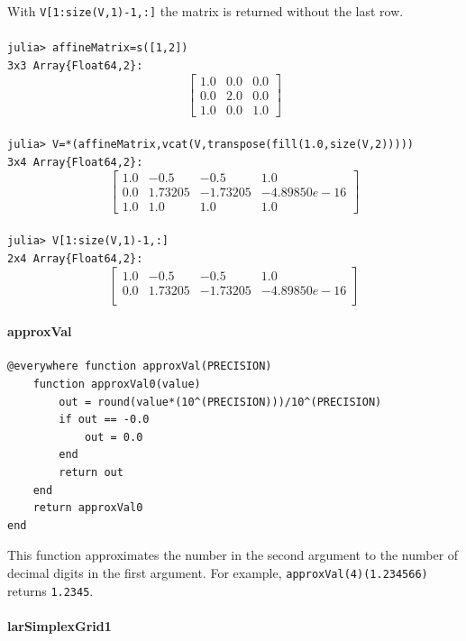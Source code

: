 \documentclass{article}
\begin{document}
With \verb!V[1:size(V,1)-1,:]! the matrix is returned without the last row.\\\\
\verb!julia> affineMatrix=s([1,2])!\\
\verb!3x3 Array{Float64,2}:!
\[
\begin{bmatrix}
1.0 & 0.0 & 0.0  \\
0.0 & 2.0 & 0.0  \\
1.0 & 0.0 & 1.0 
\end{bmatrix}
\]\\
\verb!julia> V=*(affineMatrix,vcat(V,transpose(fill(1.0,size(V,2)))))!\\
\verb!3x4 Array{Float64,2}:!
\[
\begin{bmatrix}
1.0 & -0.5 & -0.5 & 1.0  \\
0.0 & 1.73205 & -1.73205 & -4.89850e-16 \\
1.0 & 1.0 & 1.0 & 1.0
\end{bmatrix}
\]\\
\verb!julia> V[1:size(V,1)-1,:]!\\
\verb!2x4 Array{Float64,2}:!
\[
\begin{bmatrix}
1.0 & -0.5 & -0.5 & 1.0  \\
0.0 & 1.73205 & -1.73205 & -4.89850e-16 \\
\end{bmatrix}
\]

\paragraph{approxVal}
\begin{verbatim}
@everywhere function approxVal(PRECISION)
    function approxVal0(value)
        out = round(value*(10^(PRECISION)))/10^(PRECISION)
        if out == -0.0
            out = 0.0
        end
        return out 
    end
    return approxVal0
end
\end{verbatim}

This function approximates the number in the second argument to the number of decimal digits in the first argument. For example, \verb!approxVal(4)(1.234566)! returns \verb!1.2345!.

\paragraph{larSimplexGrid1}
\end{document}
